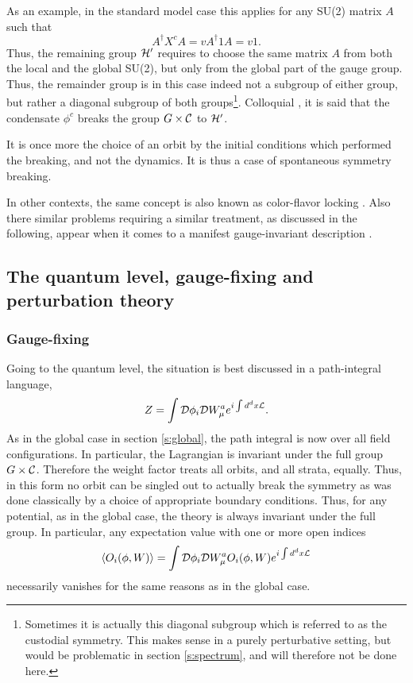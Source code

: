 \documentclass[final,12pt,3p,longtitle]{elsarticle}
\newcommand*{\La}{{\cal{L}}}
\newcommand*{\no}{\noindent}
\newcommand*{\be}{\begin{equation}}
\newcommand*{\ee}{\end{equation}}
\newcommand*{\nn}{\nonumber}
\newcommand*{\1}{1\!\!\!\bot}
\newcommand*{\la}{\left\langle}
\newcommand*{\ra}{\right\rangle}
\newcommand*{\cd}{{\cal D}}
\newcommand*{\pint}{\int\cd}
\begin{document}
As an example, in the standard model case this applies for any SU(2) matrix $A$ such that
\be
A^\dagger X^c A=v A^\dagger 1 A=v 1\label{colfmix}.
\ee
\no Thus, the remaining group ${\cal H}'$ requires to choose the same matrix $A$ from both the local and the global SU(2), but only from the global part of the gauge group. Thus, the remainder group is in this case indeed not a subgroup of either group, but rather a diagonal subgroup of both groups\footnote{Sometimes it is actually this diagonal subgroup which is referred to as the custodial symmetry. This makes sense in a purely perturbative setting, but would be problematic in section \ref{s:spectrum}, and will therefore not be done here.}. Colloquial \cite{Bohm:2001yx}, it is said that the condensate $\phi^c$ breaks the group $G\times{\cal C}$ to ${\cal H}'$. 

It is once more the choice of an orbit by the initial conditions which performed the breaking, and not the dynamics. It is thus a case of spontaneous symmetry breaking.

In other contexts, the same concept is also known as color-flavor locking \cite{Buballa:2003qv,Maas:2012ct}. Also there similar problems requiring a similar treatment, as discussed in the following, appear when it comes to a manifest gauge-invariant description \cite{Maas:2012ct,Schafer:1998ef,Alford:1999pa}.

\subsection{The quantum level, gauge-fixing and perturbation theory}\label{ss:qulev}

\subsubsection{Gauge-fixing}

Going to the quantum level, the situation is best discussed in a path-integral language,
\be
Z=\pint\phi_i\cd W_\mu^a e^{i\int d^d x\La}\nn.
\ee
\no As in the global case in section \ref{s:global}, the path integral is now over all field configurations. In particular, the Lagrangian is invariant under the full group $G\times{\cal C}$. Therefore the weight factor treats all orbits, and all strata, equally. Thus, in this form no orbit can be singled out to actually break the symmetry as was done classically by a choice of appropriate boundary conditions. Thus, for any potential, as in the global case, the theory is always invariant under the full group. In particular, any expectation value with one or more open indices
\be
\la O_i(\phi,W)\ra=\pint\phi_i\cd W_\mu^a O_i(\phi,W) e^{i\int d^d x\La}\nn
\ee
\no necessarily vanishes for the same reasons as in the global case.
\end{document}
